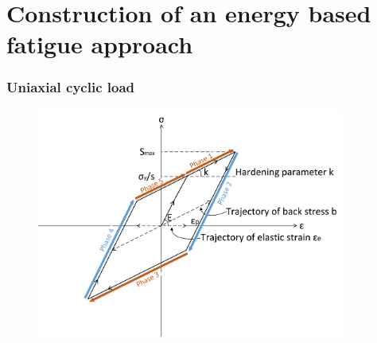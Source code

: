 \documentclass[xcolor=table]{Bredelebeamer}
\begin{document}
\section{Construction of an energy based fatigue approach}
\begin{frame}
	\frametitle{Uniaxial cyclic load}	
	\begin{figure}[h!]
		\centering
		\includegraphics[width=0.9\textwidth]{figures//backstress.png} 
		\label{backstress}
	\end{figure}
\end{frame}	

\end{document}
